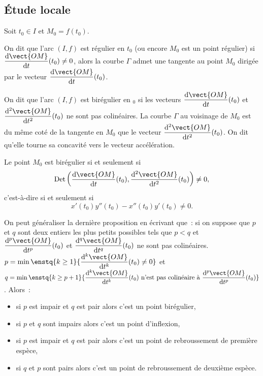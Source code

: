 \subsection{Étude locale}
Soit $t_0 \in I$ et $M_0=f(t_0)$.
\begin{defdef}
 On dit que l'arc $(I,f)$ est régulier en $t_0$ (ou encore $M_0$ est un point régulier) si $\derived{\vect{OM}}{t}(t_0) \neq 0$, alors la courbe $\Gamma$ admet une tangente au point $M_0$ dirigée par le vecteur $\derived{\vect{OM}}{t}(t_0)$.%
\end{defdef}
\begin{defdef}
 On dit que l'arc $(I,f)$ est birégulier en $_0$ si les vecteurs $\derived{\vect{OM}}{t}(t_0)$ et $\deriveds{\vect{OM}}{t}(t_0)$ ne sont pas colinéaires. La courbe $\Gamma$ au voisinage de $M_0$ est du même coté de la tangente en $M_0$ que le vecteur $\deriveds{\vect{OM}}{t}(t_0)$. On dit qu'elle \og tourne sa concavité\fg{} vers le vecteur accélération.
\end{defdef}
\begin{prop}
 Le point $M_0$ est birégulier si et seulement si 
 \begin{equation}
  \Det\left(\derived{\vect{OM}}{t}(t_0),\deriveds{\vect{OM}}{t}(t_0)\right) \neq 0,
 \end{equation}
 c'est-à-dire si et seulement si
 \begin{equation}
  x'(t_0)y''(t_0) - x''(t_0)y'(t_0) \neq 0.
 \end{equation}
\end{prop}
On peut généraliser la dernière proposition en écrivant que~: si on suppose que $p$ et $q$ sont deux entiers les plus petits possibles tels que $p<q$ et $\dfrac{\D^p \vect{OM}}{\D t^p}(t_0)$ et $\dfrac{\D^q \vect{OM}}{\D t^q}(t_0)$ ne sont pas colinéaires. $p=\min\enstq{k\geq 1}{\dfrac{\D^k \vect{OM}}{\D t^k}(t_0) \neq 0}$ et $q=\min\enstq{k\geq p+1}{\dfrac{\D^k \vect{OM}}{\D t^k}(t_0) \text{~n'est pas colinéaire à~} \dfrac{\D^p \vect{OM}}{\D t^p}(t_0)}$. Alors~:
\begin{itemize}
\item si $p$ est impair et $q$ est pair alors c'est un point birégulier,
\item si $p$ et $q$ sont impairs alors c'est un point d'inflexion,
\item si $p$ est impair et $q$ est pair alors c'est un point de rebroussement de première espèce,
\item si $q$ et $p$ sont pairs alors c'est un point de rebroussement de deuxième espèce.
\end{itemize}
